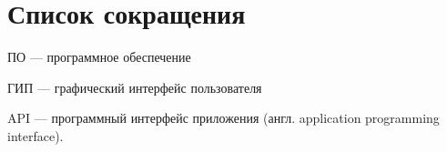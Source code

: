 \chapter*{Список сокращения}

ПО --- программное обеспечение

ГИП --- графический интерфейс пользователя

API --- программный интерфейс приложения (англ. application programming
        interface).

